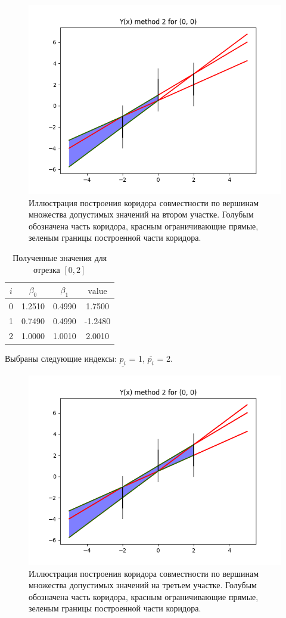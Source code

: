 \begin{figure}[H]
    \centering
    \includegraphics[width=0.8\linewidth]{image/1_example.png}
    \caption{Иллюстрация построения коридора совместности по вершинам множества допустимых значений на втором участке. Голубым обозначена часть коридора, красным ограничивающие прямые, зеленым границы построенной части коридора.}
    \label{fig:my_label}
\end{figure}

\begin{table}[H]
    \centering
    \begin{tabular}{|c|c|c|c|}
        \hline
        $i$ & $\beta_0$ & $\beta_1$ & $\text{value}$ \\ \hline
        0 & 1.2510 & 0.4990 & 1.7500 \\ \hline
        1 & 0.7490 & 0.4990 & -1.2480 \\ \hline
        2 & 1.0000 & 1.0010 & 2.0010 \\ \hline
    \end{tabular}
    \caption{Полученные значения для отрезка $[0, 2]$}
    \label{tab:my_label}
\end{table}

Выбраны следующие индексы: $\underline{p_i}$ = 1, $\overline{p_i}$ = 2.

\begin{figure}[H]
    \centering
    \includegraphics[width=0.8\linewidth]{image/2_example.png}
    \caption{Иллюстрация построения коридора совместности по вершинам множества допустимых значений на третьем участке. Голубым обозначена часть коридора, красным ограничивающие прямые, зеленым границы построенной части коридора.}
    \label{fig:my_label}
\end{figure}

